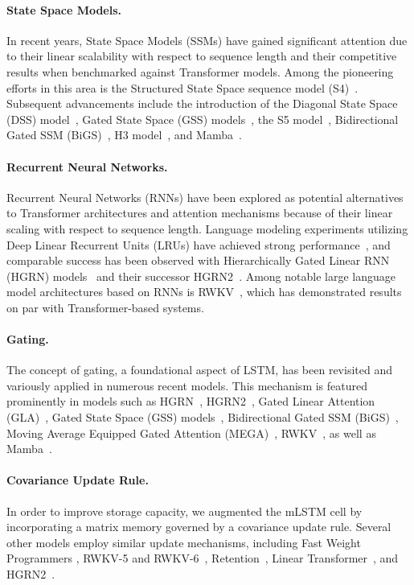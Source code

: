 \paragraph{State Space Models.} In recent years, State Space Models (SSMs) have gained significant attention due to their linear scalability with respect to sequence length and their competitive results when benchmarked against Transformer models. Among the pioneering efforts in this area is the Structured State Space sequence model (S4)~\citep{Gu:21}. Subsequent advancements include the introduction of the Diagonal State Space (DSS) model~\citep{Gupta:22}, Gated State Space (GSS) models~\citep{Mehta:22}, the S5 model~\citep{Smith:22}, Bidirectional Gated SSM (BiGS)~\citep{Wang:22}, H3 model~\citep{Fu:23}, and Mamba~\citep{Gu:24arxiv}.

\paragraph{Recurrent Neural Networks.} Recurrent Neural Networks (RNNs) have been explored as potential alternatives to Transformer architectures and attention mechanisms because of their linear scaling with respect to sequence length. Language modeling experiments utilizing Deep Linear Recurrent Units (LRUs) have achieved strong performance~\citep{Orvieto:23, De:24arxiv}, and comparable success has been observed with Hierarchically Gated Linear RNN (HGRN) models~\citep{Qin:23} and their successor HGRN2~\citep{Qin:24arxiv}. Among notable large language model architectures based on RNNs is RWKV~\citep{Peng:23arxivshort,Peng:24arxivshort}, which has demonstrated results on par with Transformer-based systems.

\paragraph{Gating.}
The concept of gating, a foundational aspect of LSTM, has been revisited and variously applied in numerous recent models. This mechanism is featured prominently in models such as HGRN~\citep{Qin:23}, HGRN2~\citep{Qin:24arxiv}, Gated Linear Attention (GLA)~\citep{Yang:23arxiv}, Gated State Space (GSS) models~\citep{Mehta:22}, Bidirectional Gated SSM (BiGS)~\citep{Wang:22}, Moving Average Equipped Gated Attention (MEGA)~\citep{Ma:22}, RWKV~\citep{Peng:23arxivshort}, as well as Mamba~\citep{Gu:24arxiv}.

\paragraph{Covariance Update Rule.} In order to improve storage capacity, we augmented the mLSTM cell by incorporating a matrix memory governed by a covariance update rule. Several other models employ similar update mechanisms, including Fast Weight Programmers \citep{Schmidhuber:92ncfastweights,Schlag:21}, RWKV-5 and RWKV-6~\citep{Peng:24arxivshort}, Retention~\citep{Sun:23arxiv}, Linear Transformer~\citep{Katharopoulos:20}, and HGRN2~\citep{Qin:24arxiv}.

